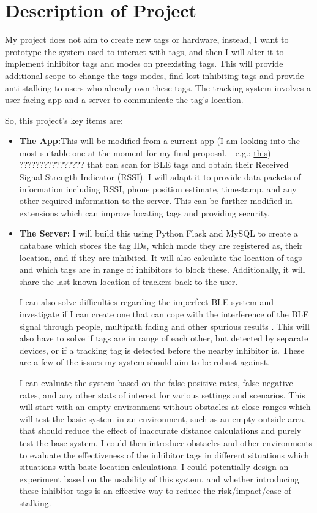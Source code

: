 \documentclass{article}
\begin{document}
\section{Description of Project}


My project does not aim to create new tags or hardware, instead, I want to prototype the system used to interact with tags, and then I will alter it to implement inhibitor tags and modes on preexisting tags. This will provide additional scope to change the tags modes, find lost inhibiting tags and provide anti-stalking to users who already own these tags.
The tracking system involves a user-facing app and a server to communicate the tag's location.


So, this project's key items are:
\begin{itemize}
\item{ {\bf The App:}This will be modified from a current app (I am looking into the most suitable one at the moment for my final proposal, - e.g.: \href{https://github.com/neXenio/BLE-Indoor-Positioning}{this}) ???????????????? that can scan for BLE tags and obtain their Received Signal Strength Indicator (RSSI). I will adapt it to provide data packets of information including RSSI, phone position estimate, timestamp, and any other required information to the server. This can be further modified in extensions which can improve locating tags and providing security.}


\item{{\bf The Server:} I will build this using Python Flask and MySQL to create a database which stores the tag IDs, which mode they are registered as, their location, and if they are inhibited. It will also calculate the location of tags and which tags are in range of inhibitors to block these. Additionally, it will share the last known location of trackers back to the user.}


I can also solve difficulties regarding the imperfect BLE system and investigate if I can create one that can cope with the interference of the BLE signal through people, multipath fading and other spurious results \cite{AccuracyBLE}. This will also have to solve if tags are in range of each other, but detected by separate devices, or if a tracking tag is detected before the nearby inhibitor is. These are a few of the issues my system should aim to be robust against.


I can evaluate the system based on the false positive rates, false negative rates, and any other stats of interest for various settings and scenarios. This will start with an empty environment without obstacles at close ranges which will test the basic system in an environment, such as an empty outside area, that should reduce the effect of inaccurate distance calculations and purely test the base system. I could then introduce obstacles and other environments to evaluate the effectiveness of the inhibitor tags in different situations which situations with basic location calculations. I could potentially design an experiment based on the usability of this system, and whether introducing these inhibitor tags is an effective way to reduce the risk/impact/ease of stalking.





\end{itemize}
\end{document}
